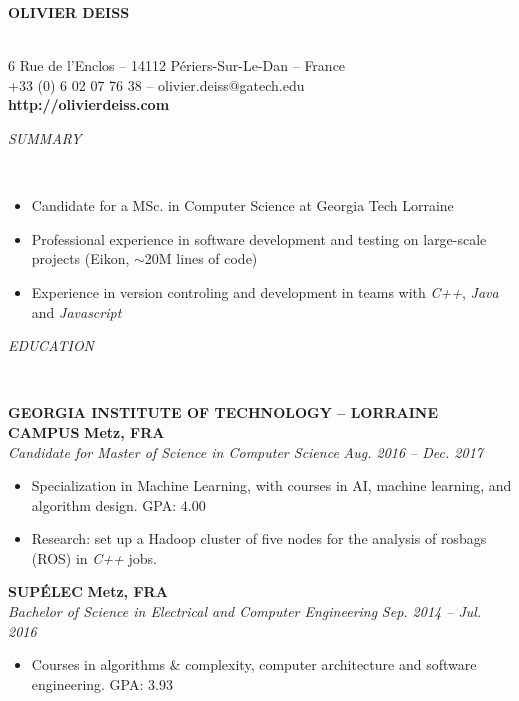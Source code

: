 \documentclass[a4paper, 12pt]{article}
\newcommand{\marginline}{-0.3cm}
\newcommand{\margincontent}{-0.6cm}
\newcommand{\marginsummary}{-0.3cm}
\newcommand{\marginbeforesection}{0.3cm}
\newcommand{\marginaftersummary}{0.2cm}
\newcommand{\linewidthperso}{0.02cm}
\newcommand{\stylesection}[1]{
  \vspace{\marginbeforesection}
  \begin{normalsize}\textit{#1}\end{normalsize}
  \vspace{\marginline}\\
  \noindent\makebox[\linewidth]{\rule{\textwidth}{\linewidthperso}}

}
\newcommand{\styletitle}[1]{\textbf{#1}}
\newcommand{\styledesc}[1]{\textit{#1}}
\newcommand{\styleloc}[1]{\textbf{#1}}
\newcommand{\styledates}[1]{\textit{#1}}
\begin{document}
\begin{footnotesize}

\begin{center}
  \begin{small}\textbf{OLIVIER DEISS}\end{small}\\
  6 Rue de l'Enclos -- 14112 P\'eriers-Sur-Le-Dan -- France\\
  +33 (0) 6 02 07 76 38 -- olivier.deiss@gatech.edu\\
  \textbf{http://olivierdeiss.com}
\end{center}

\stylesection{SUMMARY}

\vspace{\marginsummary}
\begin{itemize}
  \item Candidate for a MSc. in Computer Science at Georgia Tech Lorraine
  \item Professional experience in software development and testing on large-scale projects (Eikon, $\sim$20M lines of code)
  \item Experience in version controling and development in teams with \textit{C++}, \textit{Java} and \textit{Javascript}
\end{itemize}
\vspace{\marginaftersummary}

\stylesection{EDUCATION}

\styletitle{GEORGIA INSTITUTE OF TECHNOLOGY -- LORRAINE CAMPUS} \hfill \styleloc{Metz, FRA}\\
\styledesc{Candidate for Master of Science in Computer Science} \hfill \styledates{Aug. 2016 -- Dec. 2017}\\
\vspace{\margincontent}
\begin{itemize}
  \item Specialization in Machine Learning, with courses in AI, machine learning, and algorithm design. \hfill GPA: 4.00
  \item Research: set up a Hadoop cluster of five nodes for the analysis of rosbags (ROS) in \textit{C++} jobs.
\end{itemize}

\styletitle{SUP\'ELEC} \hfill \styleloc{Metz, FRA}\\
\styledesc{Bachelor of Science in Electrical and Computer Engineering} \hfill \styledates{Sep. 2014 -- Jul. 2016}\\
\vspace{\margincontent}
\begin{itemize}
  \item Courses in algorithms \& complexity, computer architecture and software engineering. \hfill GPA: 3.93
\end{itemize}


\end{footnotesize}
\end{document}
